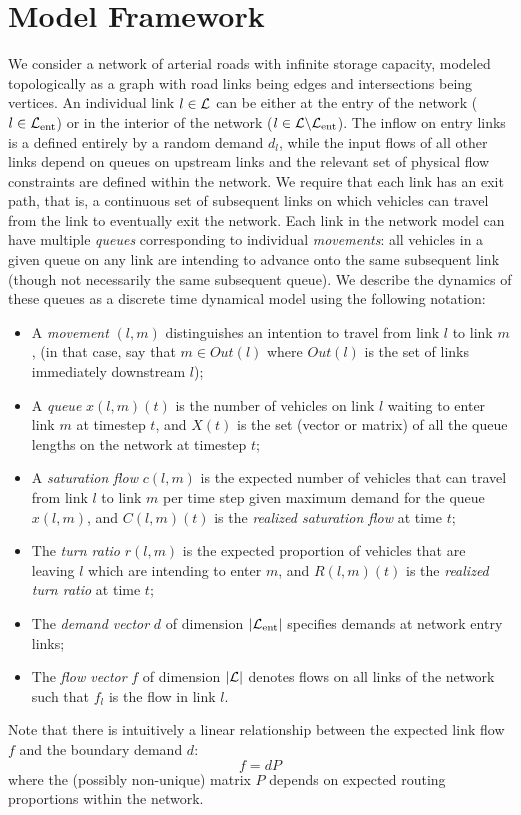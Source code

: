 \section{Model Framework} \label{sec:framework}
We consider a network of arterial roads with infinite storage capacity, modeled topologically as a graph with road links being edges and intersections being vertices. An individual link $l\in\mathcal{L}$  can be either at the entry of the network ($l \in \mathcal{L}_{\text{ent}}$) or in the interior of the network ($l \in\mathcal{L}\backslash \mathcal{L}_{\text{ent}} $). The inflow on entry links is a defined entirely by a random demand $d_{l}$, while the input flows of all other links depend on queues on upstream links and the relevant set of physical flow constraints are defined within the network. We require that each link has an exit path, that is, a continuous set of subsequent links on which vehicles can travel from the link to eventually exit the network.  Each link in the network model can have multiple \emph{queues} corresponding to individual \emph{movements}:  all vehicles in a given queue on any link are intending to advance onto the same subsequent link (though not necessarily the same subsequent queue). We describe the dynamics of these queues as a discrete time dynamical model using the following notation: 
\begin{itemize}
 \itemsep 1pt \parskip 0pt
\item A \emph{movement} $(l,m)$ distinguishes an intention to travel from link $l$ to link $m$,
(in that case, say that $m \in Out(l)$ where $Out(l)$ is the set of links immediately downstream $l$);
\item A \emph{queue} $x(l,m)(t)$ is the number of vehicles on link $l$ waiting to enter link $m$ at timestep $t$, and $X(t)$ is the set (vector or matrix) of all the queue lengths on the network at timestep $t$;
\item A \emph{saturation flow} $c(l,m)$ is the expected number of vehicles that can travel from link $l$ to link $m$ per time step given maximum demand for the queue $x(l,m)$, and $C(l,m)(t)$ is the \emph{realized saturation flow} at time $t$; 
\item The \emph{turn ratio} $r(l,m)$ is the expected proportion of vehicles that are leaving $l$ which are intending to enter $m$, and $R(l,m)(t)$ is the \emph{realized turn ratio} at time $t$;
\item The \emph{demand vector} $d$ of dimension $|\mathcal{L}_{\text{ent}}|$ specifies demands at network entry links;
\item The \emph{flow vector} $f$ of dimension $|\mathcal{L}|$ denotes flows on all links of the network such that $f_{l}$ is the flow in link $l$. 
\end{itemize}
Note that there is intuitively a linear relationship between the expected link flow $f$ and the boundary demand $d$: 
\begin{equation} \label{fd_relation}
f=dP
\end{equation}
where the (possibly non-unique) matrix $P$ depends on expected routing proportions within the network.
\vspace{-.5em}
